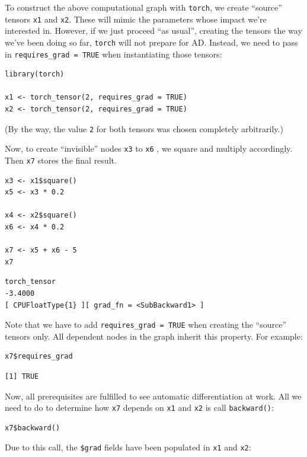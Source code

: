 \documentclass[
  letterpaper,
]{krantz}
\begin{document}
To construct the above computational graph with \texttt{torch}, we
create ``source'' tensors \texttt{x1} and \texttt{x2}. These will mimic
the parameters whose impact we're interested in. However, if we just
proceed ``as usual'', creating the tensors the way we've been doing so
far, \texttt{torch} will not prepare for AD. Instead, we need to pass in
\texttt{requires\_grad\ =\ TRUE} when instantiating those tensors:

\begin{verbatim}
library(torch)

x1 <- torch_tensor(2, requires_grad = TRUE)
x2 <- torch_tensor(2, requires_grad = TRUE)
\end{verbatim}

(By the way, the value \texttt{2} for both tensors was chosen completely
arbitrarily.)

Now, to create ``invisible'' nodes \texttt{x3} to \texttt{x6} , we
square and multiply accordingly. Then \texttt{x7} stores the final
result.

\begin{verbatim}
x3 <- x1$square()
x5 <- x3 * 0.2

x4 <- x2$square()
x6 <- x4 * 0.2

x7 <- x5 + x6 - 5
x7
\end{verbatim}

\begin{verbatim}
torch_tensor
-3.4000
[ CPUFloatType{1} ][ grad_fn = <SubBackward1> ]
\end{verbatim}

Note that we have to add \texttt{requires\_grad\ =\ TRUE} when creating
the ``source'' tensors only. All dependent nodes in the graph inherit
this property. For example:

\begin{verbatim}
x7$requires_grad
\end{verbatim}

\begin{verbatim}
[1] TRUE
\end{verbatim}

Now, all prerequisites are fulfilled to see automatic differentiation at
work. All we need to do to determine how \texttt{x7} depends on
\texttt{x1} and \texttt{x2} is call \texttt{backward()}:

\begin{verbatim}
x7$backward()
\end{verbatim}

Due to this call, the \texttt{\$grad} fields have been populated in
\texttt{x1} and \texttt{x2}:
\end{document}
